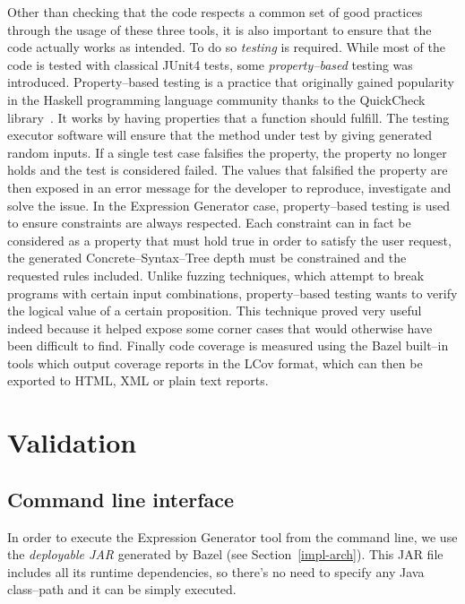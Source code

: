 \documentclass[]{usiinfbachelorproject}
\begin{document}
Other than checking that the code respects a common set of good practices
through the usage of these three tools, it is also important to ensure that
the code actually works as intended. To do so \textit{testing} is required.
While most of the code is tested with classical JUnit4 tests, some 
\textit{property–based} testing was introduced. Property–based testing is a
practice that originally gained popularity in the Haskell programming language
community thanks to the QuickCheck library~\cite{acmquickcheck}. It works by
having properties that a function should fulfill.
The testing executor software will ensure that the method under test by
giving generated random inputs.
If a single test case falsifies the property, the property no longer holds and
the test is considered failed. The values that falsified the property are
then exposed in an error message for the developer to reproduce, investigate
and solve the issue.
In the Expression Generator case, property–based testing is used to ensure
constraints are always respected. Each constraint can in fact be considered as
a property that must hold true in order to satisfy the user request, the
generated Concrete–Syntax–Tree depth must be constrained and the requested rules
included.
Unlike fuzzing techniques, which attempt to break programs with certain input
combinations, property–based testing wants to verify the logical value of
a certain proposition.
This technique proved very useful indeed because it helped expose some corner
cases that would otherwise have been difficult to find.
Finally code coverage is measured using the Bazel built–in tools which output
coverage reports in the LCov format, which can then be exported to HTML, XML
or plain text reports.

\newpage

\section{Validation}\label{validation}

\subsection{Command line interface}

In order to execute the Expression Generator tool from the command line,
we use the \textit{deployable JAR} generated by Bazel (see
Section~\ref{impl-arch}).
This JAR file includes all its runtime dependencies, so there's no need
to specify any Java class–path and it can be simply executed.
\end{document}
